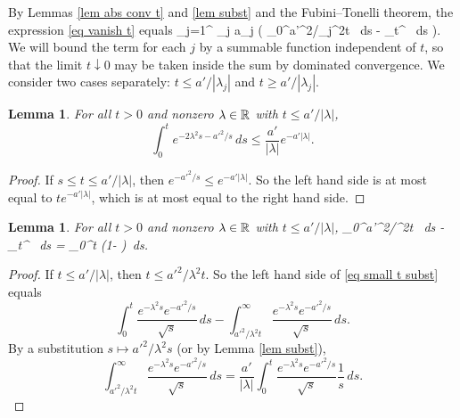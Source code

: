 \documentclass[11pt]{article}
\theoremstyle{plain}
\newtheorem{lemma}[theorem]{Lemma}
\theoremstyle{definition}
\theoremstyle{remark}
\numberwithin{equation}{section}
\begin{document}
By Lemmas \ref{lem abs conv t} and \ref{lem subst} and the Fubini--Tonelli theorem, the expression \eqref{eq vanish t} equals
\sum_{j=1}^{\infty} \lambda_j a_j
\left(
\int_0^{a'^2/\lambda_j^2t}
 \, ds -
\int_t^{\infty}
 \, ds
 \right).
\eeq
We will bound the term for each $j$ by a summable function independent of $t$, so that the limit $t \downarrow 0$ may be taken inside the sum by dominated convergence. We consider two cases separately: $t \leq a'/|\lambda_j|$ and $t \geq a'/|\lambda_j|$.

\begin{lemma}\label{lem small t est 1}
For all $t> 0$ and nonzero $\lambda \in \mathbb{R}$ with $t \leq a'/|\lambda|$,
\[
\int_0^t e^{-2\lambda^2 s - a'^2/s}\, ds \leq \frac{a'}{|\lambda|} e^{-a'|\lambda|}.
\]
\end{lemma}
\begin{proof}
If $s \leq t \leq a'/|\lambda|$, then $e^{-a'^2/s} \leq e^{-a'|\lambda|}$. So the left hand side is at most equal to $t e^{-a'|\lambda|}$, which is at most equal to the right hand side.
\end{proof}

\begin{lemma}\label{lem small t subst}
For all $t> 0$ and nonzero $\lambda \in \mathbb{R}$ with $t \leq a'/|\lambda|$,
\int_0^{a'^2/\lambda^2t}
 \, ds -
\int_t^{\infty}
 \, ds
 = \int_0^t
  \left(1- \right)\, ds.
\eeq
\end{lemma}
\begin{proof}
If $t \leq a'/|\lambda|$, then $t \leq a'^2/\lambda^2t$.
So the left hand side of \eqref{eq small t subst} equals
\[
\int_0^{t}
 \frac{e^{-\lambda^2 s} e^{-a'^2/s}}{\sqrt{s}}\, ds -
\int_{a'^2/\lambda^2 t}^{\infty}
 \frac{e^{-\lambda^2 s} e^{-a'^2/s}}{\sqrt{s}}\, ds.
\]
By a substitution $s\mapsto a'^2/\lambda^2 s$ (or by Lemma \ref{lem subst}),
\[
\int_{a'^2/\lambda^2 t}^{\infty}
 \frac{e^{-\lambda^2 s} e^{-a'^2/s}}{\sqrt{s}}\, ds = \frac{a'}{|\lambda|} \int_0^t
  \frac{e^{-\lambda^2 s} e^{-a'^2/s}}{\sqrt{s}} \frac{1}{s}\, ds.
\]
\end{proof}
\end{document}
